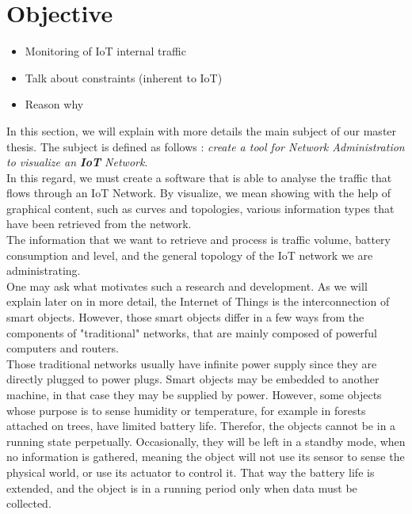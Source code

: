 \section{Objective}

\begin{itemize}
	\item Monitoring of IoT internal traffic
	\item Talk about constraints (inherent to IoT)
	\item Reason why 
\end{itemize}

In this section, we will explain with more details the main subject of our master thesis. The subject is defined as follows : \textit{create a tool for Network Administration to visualize an \textbf{IoT} Network}.\\

In this regard, we must create a software that is able to analyse the traffic that flows through an IoT Network. By visualize, we mean showing with the help of graphical content, such as curves and topologies, various information types that have been retrieved from the network.\\

The information that we want to retrieve and process is traffic volume, battery consumption and level, and the general topology of the IoT network we are administrating.\\

One may ask what motivates such a research and development. As we will explain later on in more detail, the Internet of Things is the interconnection of smart objects. However, those smart objects differ in a few ways from the components of "traditional" networks, that are mainly composed of powerful computers and routers.\\

Those traditional networks usually have infinite power supply since they are directly plugged to power plugs. Smart objects may be embedded to another machine, in that case they may be supplied by power. However, some objects whose purpose is to sense humidity or temperature, for example in forests attached on trees, have limited battery life. Therefor, the objects cannot be in a running state perpetually. Occasionally, they will be left in a standby mode, when no information is gathered, meaning the object will not use its sensor to sense the physical world, or use its actuator to control it. That way the battery life is extended, and the object is in a running period only when data must be collected. \\

